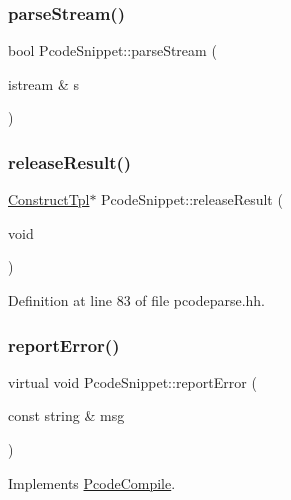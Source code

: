 \subsubsection{\texorpdfstring{parseStream()}{parseStream()}}
{\footnotesize\ttfamily bool Pcode\+Snippet\+::parse\+Stream (\begin{DoxyParamCaption}\item[{istream \&}]{s }\end{DoxyParamCaption})}

\mbox{\label{class_pcode_snippet_a0d97b99a25f3702e6718d9e1c2f139b1}} 
\subsubsection{\texorpdfstring{releaseResult()}{releaseResult()}}
{\footnotesize\ttfamily \mbox{\hyperlink{class_construct_tpl}{Construct\+Tpl}}$\ast$ Pcode\+Snippet\+::release\+Result (\begin{DoxyParamCaption}\item[{void}]{ }\end{DoxyParamCaption})\hspace{0.3cm}{\ttfamily [inline]}}



Definition at line 83 of file pcodeparse.\+hh.

\mbox{\label{class_pcode_snippet_ad9512a3125317bde59fc0de0b6f7d7ad}} 
\subsubsection{\texorpdfstring{reportError()}{reportError()}}
{\footnotesize\ttfamily virtual void Pcode\+Snippet\+::report\+Error (\begin{DoxyParamCaption}\item[{const string \&}]{msg }\end{DoxyParamCaption})\hspace{0.3cm}{\ttfamily [virtual]}}



Implements \mbox{\hyperlink{class_pcode_compile_af18d2709e08b84b7cb21fbf1411a9f82}{Pcode\+Compile}}.

